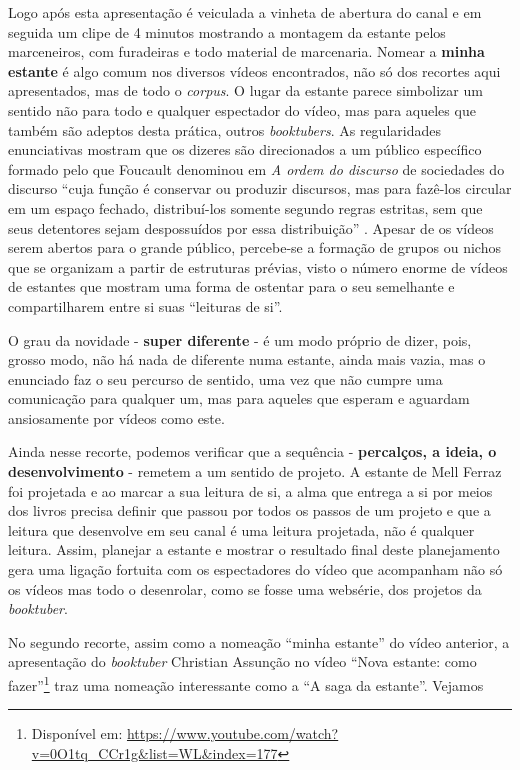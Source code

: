 Logo após esta apresentação é veiculada a vinheta de abertura do canal e
em seguida um clipe de 4 minutos mostrando a montagem da estante pelos
marceneiros, com furadeiras e todo material de marcenaria. Nomear a
\textbf{minha estante} é algo comum nos diversos vídeos
encontrados, não só dos recortes aqui apresentados, mas de todo o
\textit{corpus}. O lugar da estante parece simbolizar um sentido não para
todo e qualquer espectador do vídeo, mas para aqueles que também são
adeptos desta prática, outros \textit{booktubers}. As regularidades
enunciativas mostram que os dizeres são direcionados a um público
específico formado pelo que Foucault denominou em \textit{A ordem do
discurso} de sociedades do discurso \enquote{cuja função é conservar ou
produzir discursos, mas para fazê-los circular em um espaço fechado,
distribuí-los somente segundo regras estritas, sem que seus detentores
sejam despossuídos por essa distribuição} \cite[p.~39]{foucault2010ordem}.
Apesar de os vídeos serem abertos para o grande público, percebe-se a
formação de grupos ou nichos que se organizam a partir de estruturas
prévias, visto o número enorme de vídeos de estantes que mostram uma
forma de ostentar para o seu semelhante e compartilharem entre si suas
\enquote{leituras de si}.

O grau da novidade - \textbf{super diferente} - é um modo
próprio de dizer, pois, grosso modo, não há nada de diferente numa
estante, ainda mais vazia, mas o enunciado faz o seu percurso de
sentido, uma vez que não cumpre uma comunicação para qualquer um, mas
para aqueles que esperam e aguardam ansiosamente por vídeos como este.

Ainda nesse recorte, podemos verificar que a sequência -
\textbf{percalços, a ideia, o desenvolvimento} - remetem a um
sentido de projeto. A estante de Mell Ferraz foi projetada e ao marcar a
sua leitura de si, a alma que entrega a si por meios dos livros precisa
definir que passou por todos os passos de um projeto e que a leitura que
desenvolve em seu canal é uma leitura projetada, não é qualquer leitura.
Assim, planejar a estante e mostrar o resultado final deste planejamento
gera uma ligação fortuita com os espectadores do vídeo que acompanham
não só os vídeos mas todo o desenrolar, como se fosse uma websérie, dos
projetos da \textit{booktuber}.

No segundo recorte, assim como a nomeação \enquote{minha estante} do vídeo
anterior, a apresentação do \textit{booktuber} Christian Assunção no vídeo
\enquote{Nova estante: como fazer}\footnote{Disponível em:
  \url{https://www.youtube.com/watch?v=0O1tq\_CCr1g\&list=WL\&index=177}} traz
uma nomeação interessante como a \enquote{A saga da estante}. Vejamos

